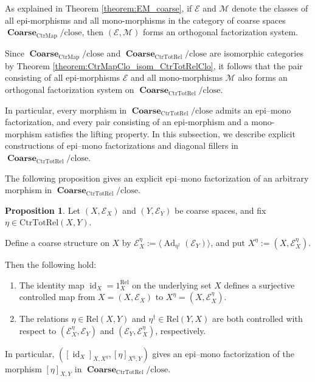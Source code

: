 \documentclass[12pt, a4paper]{amsart}
\theoremstyle{definition}
\newtheorem{proposition}[theorem]{Proposition}
\newcommand{\Ad}{\mathop{\mathrm{Ad}}\nolimits}
\newcommand{\id}{\mathop{\mathrm{id}}\nolimits}
\newcommand{\Coarse}{\mathop{\mathbf{Coarse}}\nolimits}
\newcommand{\Rel}{\mathrm{Rel}}
\newcommand{\CtrMap}{\mathrm{CtrMap}}
\newcommand{\CtrTotRel}{\mathrm{CtrTotRel}}
\newcommand{\close}{\mathrm{close}}
\begin{document}
As explained in Theorem \ref{theorem:EM_coarse}, if $\mathcal{E}$ and
$\mathcal{M}$ denote the classes of all epi-morphisms and all mono-morphisms
in the category of coarse spaces
$\Coarse_{\CtrMap}/{\close}$, then
$(\mathcal{E},\mathcal{M})$
forms an orthogonal factorization system.

Since
$\Coarse_{\CtrMap}/{\close}$
and
$\Coarse_{\CtrTotRel}/{\close}$
are isomorphic categories by
Theorem \ref{theorem:CtrMapClo_isom_CtrTotRelClo},
it follows that the pair consisting of all epi-morphisms
$\mathcal{E}$
and all mono-morphisms
$\mathcal{M}$
also forms an orthogonal factorization system on
$\Coarse_{\CtrTotRel}/{\close}$.

In particular, every morphism in
$\Coarse_{\CtrTotRel}/{\close}$
admits an epi--mono factorization, and every pair consisting of an
epi-morphism and a mono-morphism satisfies the lifting property.
In this subsection, we describe explicit constructions of epi--mono
factorizations and diagonal fillers in
$\Coarse_{\CtrTotRel}/{\close}$.

The following proposition gives an explicit epi--mono factorization of an
arbitrary morphism in
$\Coarse_{\CtrTotRel}/{\close}$.

\begin{proposition}\label{proposition:epimonofucttame}
Let $(X,\mathcal{E}_X)$ and $(Y,\mathcal{E}_Y)$ be coarse spaces, and fix
$\eta \in \CtrTotRel(X,Y)$.

Define a coarse structure on $X$ by 
$\mathcal{E}_X^\eta
:=
\langle
\Ad_{\eta^\dagger}(\mathcal{E}_Y)
\rangle$,
and put 
$X^\eta
:=
(X,\mathcal{E}_X^\eta)$.

Then the following hold:
\begin{enumerate}
\item
The identity map
$\id_X = 1_X^{\Rel}$
on the underlying set $X$ defines a surjective controlled map
from
$X=(X,\mathcal{E}_X)$
to
$X^\eta=(X,\mathcal{E}_X^\eta)$.

\item
The relations
$\eta \in \Rel(X,Y)$
and
$\eta^\dagger \in \Rel(Y,X)$
are both controlled with respect to
$(\mathcal{E}_X^\eta,\mathcal{E}_Y)$
and
$(\mathcal{E}_Y,\mathcal{E}_X^\eta)$,
respectively.
\end{enumerate}

In particular,
$([\id_X]_{X,X^\eta},[\eta]_{X^\eta,Y})$
gives an epi--mono factorization of the morphism
$[\eta]_{X,Y}$
in
$\Coarse_{\CtrTotRel}/{\close}$.
\end{proposition}
\end{document}
